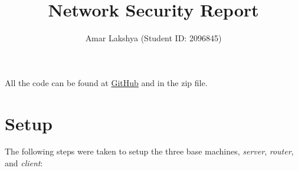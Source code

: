 \documentclass[preprint,12pt]{elsarticle}
\begin{document}
\begin{frontmatter}



\title{Network Security Report}


\author{Amar Lakshya (Student ID: 2096845)}

\address{School of Computer Science, University of Birmingham}


\end{frontmatter}



All the code can be found at \href{https://github.com/amar-laksh/UNI/tree/master/assignments/NS/virtualbox}{GitHub} and in the zip file.
\section{Setup}
\label{s:Setup}
The following steps were taken to setup the three base machines, \textit{server}, \textit{router}, and \textit{client}:
\end{document}
